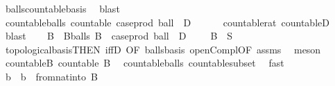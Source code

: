 \begin{isabellebody}
\ balls{\isacharunderscore}{\kern0pt}countable{\isacharunderscore}{\kern0pt}basis\ \isamarkupfalse%
\ blast\isanewline
\ \ \isamarkupfalse%
\ countable{\isacharunderscore}{\kern0pt}balls{\isacharcolon}{\kern0pt}\ {\isachardoublequoteopen}countable\ {\isacharparenleft}{\kern0pt}case{\isacharunderscore}{\kern0pt}prod\ ball\ {\isacharbackquote}{\kern0pt}\ {\isacharparenleft}{\kern0pt}D\ {\isasymtimes}\ {\isacharparenleft}{\kern0pt}{\isasymrat}\ {\isasyminter}\ {\isacharbraceleft}{\kern0pt}{}{\isacharless}{\kern0pt}{\isachardot}{\kern0pt}{\isachardot}{\kern0pt}{\isacharbraceright}{\kern0pt}{\isacharparenright}{\kern0pt}{\isacharparenright}{\kern0pt}{\isacharparenright}{\kern0pt}{\isachardoublequoteclose}\ \isamarkupfalse%
\ countable{\isacharunderscore}{\kern0pt}rat\ countable{\isacharunderscore}{\kern0pt}D\ \isamarkupfalse%
\ blast\isanewline
\isanewline
\ \ \isamarkupfalse%
\ B\ \ B{\isacharunderscore}{\kern0pt}balls{\isacharcolon}{\kern0pt}\ {\isachardoublequoteopen}B\ {\isasymsubseteq}\ case{\isacharunderscore}{\kern0pt}prod\ ball\ {\isacharbackquote}{\kern0pt}\ {\isacharparenleft}{\kern0pt}D\ {\isasymtimes}\ {\isacharparenleft}{\kern0pt}{\isasymrat}\ {\isasyminter}\ {\isacharbraceleft}{\kern0pt}{}{\isacharless}{\kern0pt}{\isachardot}{\kern0pt}{\isachardot}{\kern0pt}{\isacharbraceright}{\kern0pt}{\isacharparenright}{\kern0pt}{\isacharparenright}{\kern0pt}{\isachardoublequoteclose}\ {\isachardoublequoteopen}{\isasymUnion}B\ {\isacharequal}{\kern0pt}\ {\isacharminus}{\kern0pt}S{\isachardoublequoteclose}\ \isamarkupfalse%
\ topological{\isacharunderscore}{\kern0pt}basis{\isacharbrackleft}{\kern0pt}THEN\ iffD{}{\isacharcomma}{\kern0pt}\ OF\ balls{\isacharunderscore}{\kern0pt}basis{\isacharbrackright}{\kern0pt}\ open{\isacharunderscore}{\kern0pt}Compl{\isacharbrackleft}{\kern0pt}OF\ assms{\isacharparenleft}{\kern0pt}{}{\isacharparenright}{\kern0pt}{\isacharbrackright}{\kern0pt}\ \isamarkupfalse%
\ meson\isanewline
\ \ \isamarkupfalse%
\ countable{\isacharunderscore}{\kern0pt}B{\isacharcolon}{\kern0pt}\ {\isachardoublequoteopen}countable\ B{\isachardoublequoteclose}\ \isamarkupfalse%
\ countable{\isacharunderscore}{\kern0pt}balls\ countable{\isacharunderscore}{\kern0pt}subset\ \isamarkupfalse%
\ fast\isanewline
\isanewline
\ \ \isamarkupfalse%
\ b\ \ {\isachardoublequoteopen}b\ {\isacharequal}{\kern0pt}\ from{\isacharunderscore}{\kern0pt}nat{\isacharunderscore}{\kern0pt}into\ {\isacharparenleft}{\kern0pt}B\ {\isasymunion}\ {\isacharbraceleft}{\kern0pt}{\isacharbraceleft}{\kern0pt}{\isacharbraceright}{\kern0pt}{\isacharbraceright}{\kern0pt}{\isacharparenright}{\kern0pt}{\isachardoublequoteclose}\isanewline

\end{isabellebody}
